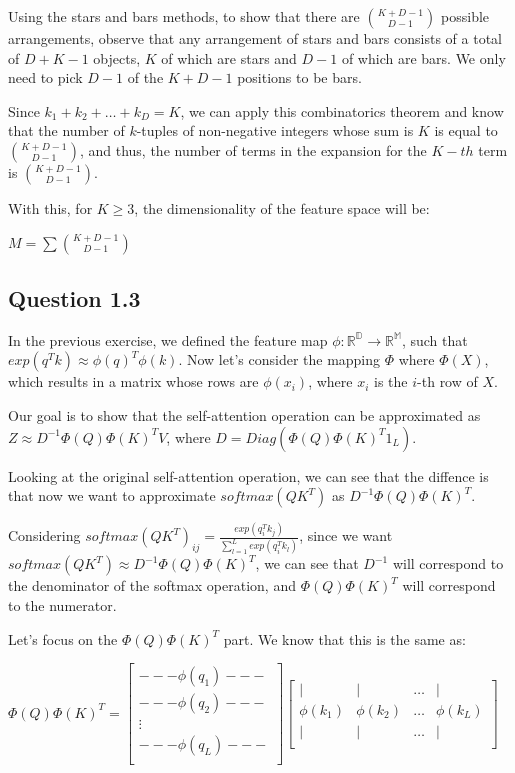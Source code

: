 \documentclass{article}
\begin{document}
Using the stars and bars methods, to show that there are $\binom{K + D -1}{D - 1}$ possible arrangements, observe that any arrangement of stars and bars consists of a 
total of $D + K - 1$ objects, $K$ of which are stars and $D - 1$ of which are bars. We only need to pick $D - 1$ of the $K + D - 1$ 
positions to be bars. 

Since $k_1 + k_2 + \dots + k_D = K$, we can apply this combinatorics theorem and know that the number of $k$-tuples of non-negative integers whose sum is $K$ is equal to
$\binom{K + D - 1}{D - 1}$, and thus, the number of terms in the expansion for the $K-th$ term is $\binom{K + D - 1}{D - 1}$.

\bigskip

With this, for $K \geq 3$, the dimensionality of the feature space will be:

$M = \sum \binom{K + D - 1}{D - 1}$

\subsection{Question 1.3}

In the previous exercise, we defined the feature map $\phi: \mathbb{R^D} \rightarrow \mathbb{R^M}$, such that $exp(q^Tk) \approx \phi(q)^T\phi(k)$. 
Now let's consider the mapping $\Phi$ where $\Phi(X)$, which results in a matrix whose rows are $\phi(x_i)$, where $x_i$ is the $i$-th row of $X$.

Our goal is to show that the self-attention operation can be approximated as $Z \approx D^{-1}\Phi(Q) \Phi(K)^T V$, 
where $D = Diag(\Phi(Q) \Phi(K)^T 1_L)$. 

Looking at the original self-attention operation, we can see that the diffence is that now we want to approximate
$softmax(QK^T)$ as $D^{-1}\Phi(Q) \Phi(K)^T$.

Considering $softmax(QK^T)_{ij} = \frac{exp(q_i^Tk_j)}{\sum_{l=1}^L exp(q_i^Tk_l)}$, since we want
$softmax(QK^T) \approx D^{-1}\Phi(Q) \Phi(K)^T$, we can see that $D^{-1}$ will correspond to the denominator of the softmax operation,
and $\Phi(Q) \Phi(K)^T$ will correspond to the numerator.

\bigskip

Let's focus on the $\Phi(Q) \Phi(K)^T$ part. We know that this is the same as:

\medskip

$
    \Phi(Q) \Phi(K)^T = 
    \begin{bmatrix}
        --- \phi(q_1) --- \\
        --- \phi(q_2) --- \\
        \vdots \\
        --- \phi(q_L) --- \\
    \end{bmatrix}
    \begin{bmatrix}
        | & | & \dots & | \\
        \phi(k_1) & \phi(k_2) & \dots & \phi(k_L) \\
        | & | & \dots & | \\
    \end{bmatrix}
$
\end{document}
